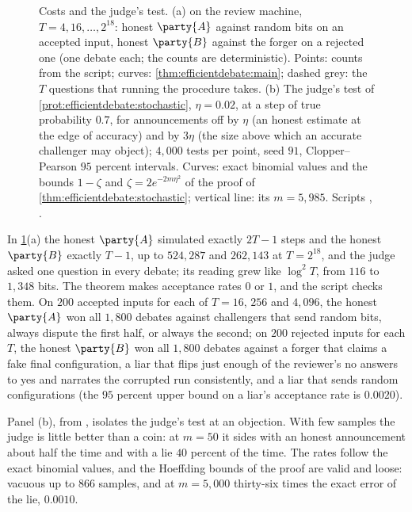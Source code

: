 \begin{refsection}
\begin{figure}[t]
\begin{fullwidth}
\end{fullwidth}
\caption{Costs and the judge's test. (a)  on the review machine, $T=4,16,\dots,2^{18}$: honest $\party{A}$ against random bits on an accepted input, honest $\party{B}$ against the forger on a rejected one (one debate each; the counts are deterministic). Points: counts from the script; curves: \cref{thm:efficientdebate:main}; dashed grey: the $T$ questions that running the procedure takes. (b) The judge's test of \cref{prot:efficientdebate:stochastic}, $\eta=0.02$, at a step of true probability $0.7$, for announcements off by $\eta$ (an honest estimate at the edge of accuracy) and by $3\eta$ (the size above which an accurate challenger may object); $4{,}000$ tests per point, seed $91$, Clopper--Pearson $95$ percent intervals. Curves: exact binomial values and the bounds $1-\zeta$ and $\zeta=2e^{-2m\eta^2}$ of the proof of \cref{thm:efficientdebate:stochastic}; vertical line: its $m=5{,}985$. Scripts , .}
\label{fig:efficientdebate:costs}
\end{figure}

In \cref{fig:efficientdebate:costs}(a) the honest $\party{A}$ simulated exactly $2T-1$ steps and the honest $\party{B}$ exactly $T-1$, up to $524{,}287$ and $262{,}143$ at $T=2^{18}$, and the judge asked one question in every debate; its reading grew like $\log^2T$, from $116$ to $1{,}348$ bits. The theorem makes acceptance rates $0$ or $1$, and the script checks them. On $200$ accepted inputs for each of $T=16$, $256$ and $4{,}096$, the honest $\party{A}$ won all $1{,}800$ debates against challengers that send random bits, always dispute the first half, or always the second; on $200$ rejected inputs for each $T$, the honest $\party{B}$ won all $1{,}800$ debates against a forger that claims a fake final configuration, a liar that flips just enough of the reviewer's no answers to yes and narrates the corrupted run consistently, and a liar that sends random configurations (the $95$ percent upper bound on a liar's acceptance rate is $0.0020$).

Panel (b), from , isolates the judge's test at an objection. With few samples the judge is little better than a coin: at $m=50$ it sides with an honest announcement about half the time and with a lie $40$ percent of the time. The rates follow the exact binomial values, and the Hoeffding bounds of the proof are valid and loose: vacuous up to $866$ samples, and at $m=5{,}000$ thirty-six times the exact error of the lie, $0.0010$.


\end{refsection}
